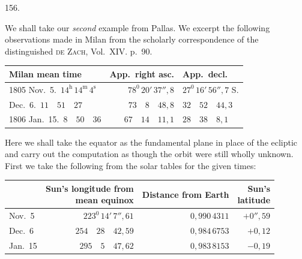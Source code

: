 \par{}\medskip
\hypertarget{native-211-article156}{}
\begin{center}156.\end{center}
We shall take our \textit{second} example from Pallas. We excerpt the following observations made in Milan from the scholarly correspondence of the distinguished \textsc{de Zach}, Vol.\ XIV. p.\ 90.
\begin{center}
\begingroup\footnotesize\setlength{\tabcolsep}{4pt}\renewcommand{\arraystretch}{1.2}
\begin{tabular}{|l|r|l|}\hline
Milan mean time & App.\ right asc. & App.\ decl.\\\hline
1805 Nov.\ 5.\ $14^{\mathrm h}\,14^{\mathrm m}\,4^{\mathrm s}$ & $78^{0}\,20'\,37''{,}8$ & $27^{0}\,16'\,56''{,}7$ S.\\
\hspace{2.4em}Dec.\ 6.\ $11\quad51\quad27$ & $73\quad8\quad48{,}8$ & $32\quad52\quad44{,}3$\\
1806 Jan.\ 15.\ $8\quad50\quad36$ & $67\quad14\quad11{,}1$ & $28\quad38\quad8{,}1$\\\hline
\end{tabular}\endgroup
\end{center}

Here we shall take the equator as the fundamental plane in place of the ecliptic and carry out the computation as though the orbit were still wholly unknown. First we take the following from the solar tables for the given times:
\begin{center}
\begingroup\footnotesize\setlength{\tabcolsep}{4pt}\renewcommand{\arraystretch}{1.2}
\begin{tabular}{|l|r|r|r|}\hline
& \shortstack{Sun's longitude from\\mean equinox} & Distance from Earth & \shortstack{Sun's\\latitude}\\\hline
Nov.\ 5 & $223^{0}\,14'\,7''{,}61$ & $0{,}990\,4311$ & $+0''{,}59$\\
Dec.\ 6 & $254\quad28\quad42{,}59$ & $0{,}984\,6753$ & $+0{,}12$\\
Jan.\ 15 & $295\quad5\quad47{,}62$ & $0{,}983\,8153$ & $-0{,}19$\\\hline
\end{tabular}\endgroup
\end{center}

